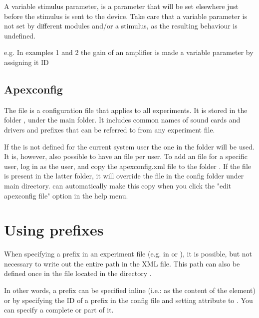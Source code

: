 \label{sec:Parameters}

A variable stimulus parameter, is a parameter that will be set
elsewhere just before the stimulus is sent to the device. Take care that a variable parameter is not set by different modules and/or a stimulus, as the resulting behaviour is undefined. 

e.g. In examples 1 and 2 the gain of an amplifier is made a
variable parameter by assigning it ID 


\subsection{Apexconfig}
\label{apexconfig}


The  file is a configuration file that
applies to all experiments. It is stored in the folder
, under the main \apex folder. It includes common
names of sound cards and drivers and prefixes that can be referred
to from any experiment file.

If the  is not defined for the current system user
the one in the \apex folder will be used. It is, however, also possible to have
an  file per user. To add an
 file for a specific user, log in as the
user, and copy the apexconfig.xml file to the folder
. If the file
 is present in the latter folder, it will
override the  file in the config folder
under main \apex directory. \apex can automatically make this copy when you click the "edit apexconfig file" option in the help menu.


\section{Using prefixes}

When specifying a prefix in an experiment file (e.g. in
 or ), it is possible, but
not necessary to write out the entire path in the XML file. This
path can also be defined once in the 
file located in the directory .

In other words, a prefix can be specified inline (i.e.: as the
content of the  element) or by specifying the
ID of a prefix in the \apex config file and setting attribute
 to . You can specify a
complete or part of it.


